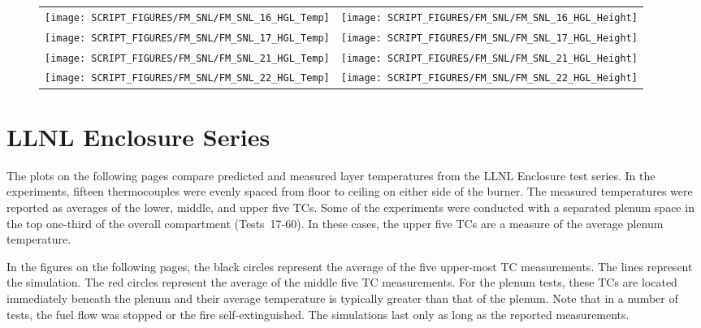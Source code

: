 \begin{figure}[p]
\begin{tabular*}{\textwidth}{l@{\extracolsep{\fill}}r}
\texttt{[image: SCRIPT\_FIGURES/FM\_SNL/FM\_SNL\_16\_HGL\_Temp]} &
\texttt{[image: SCRIPT\_FIGURES/FM\_SNL/FM\_SNL\_16\_HGL\_Height]} \\
\texttt{[image: SCRIPT\_FIGURES/FM\_SNL/FM\_SNL\_17\_HGL\_Temp]} &
\texttt{[image: SCRIPT\_FIGURES/FM\_SNL/FM\_SNL\_17\_HGL\_Height]} \\
\texttt{[image: SCRIPT\_FIGURES/FM\_SNL/FM\_SNL\_21\_HGL\_Temp]} &
\texttt{[image: SCRIPT\_FIGURES/FM\_SNL/FM\_SNL\_21\_HGL\_Height]} \\
\texttt{[image: SCRIPT\_FIGURES/FM\_SNL/FM\_SNL\_22\_HGL\_Temp]} &
\texttt{[image: SCRIPT\_FIGURES/FM\_SNL/FM\_SNL\_22\_HGL\_Height]}
\end{tabular*}
\end{figure}

\clearpage


\section{LLNL Enclosure Series}

The plots on the following pages compare predicted and measured layer temperatures from the LLNL Enclosure test series. In the experiments, fifteen thermocouples were evenly spaced from floor to ceiling on either side of the burner. The measured temperatures were reported as averages of the lower, middle, and upper five TCs. Some of the experiments were conducted with a separated plenum space in the top one-third of the overall compartment (Tests~17-60). In these cases, the upper five TCs are a measure of the average plenum temperature.

In the figures on the following pages, the black circles represent the average of the five upper-most TC measurements. The lines represent the simulation. The red circles represent the average of the middle five TC measurements. For the plenum tests, these TCs are located immediately beneath the plenum and their average temperature is typically greater than that of the plenum. Note that in a number of tests, the fuel flow was stopped or the fire self-extinguished. The simulations last only as long as the reported measurements.

\newpage

